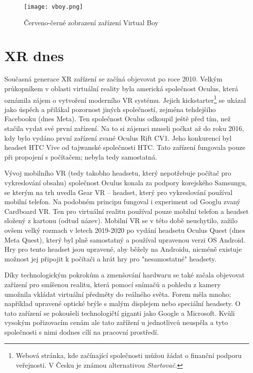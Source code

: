\begin{figure}[H]
    \centering
    \texttt{[image: vboy.png]}
    \caption{Červeno-černé zobrazení zařízení Virtual Boy \cite{vboy}}
    \label{vboy_red_display}
\end{figure}

\section{XR dnes}

Současná generace XR zařízení se začíná objevovat po roce 2010. Velkým průkopníkem v oblasti virtuální reality byla americká společnost Oculus, která oznámila zájem o vytvoření moderního VR systému. Jejich kickstarter\footnote{Webová stránka, kde začínající společnosti můžou žádat o finanční podporu veřejnosti. V Česku je známou alternativou \em Startovač.} se ukázal jako úspěch a přilákal pozornost jiných společností, zejména tehdejšího Facebooku (dnes Meta). Ten společnost Oculus odkoupil ještě před tím, než stačila vydat své první zařízení. Na to si zájemci museli počkat až do roku 2016, kdy bylo vydáno první zařízení zvané Oculus Rift CV1. Jeho konkurencí byl headset HTC Vive od tajwanské společnosti HTC. Tato zařízení fungovala pouze při propojení s počítačem; nebyla tedy samostatná. \cite{otechnice_3}

Vývoj mobilního VR (tedy takobho headsetu, který nepotřebuje počítač pro vykreslování obsahu) společnost Oculus konala za podpory korejského Samsungu, se kterým na trh uvedla Gear VR -- headset, který pro vykreslování používal mobilní telefon. Na podobném principu fungoval i experiment od Googlu zvaný Cardboard VR. Ten pro virtuální realitu používal pouze mobilní telefon a headset složený z kartonu (odtud název). Mobilní VR se v této době neuchytilo, zažilo ovšem velký rozmach v letech 2019-2020 po vydání headsetu Oculus Quest (dnes Meta Quest), který byl plně samostatný a používal upravenou verzi OS Android. Hry pro tento headset jsou upravené, aby běžely na Androidu, nicméně existuje možnost jej připojit k počítači a hrát hry pro "nesamostatné" headsety. \cite{otechnice_3}

Díky technologickým pokrokům a zmenšování hardwaru se také začala objevovat zařízení pro smíšenou realitu, která pomocí snímačů a pohledu z kamery umožnila vkládat virtuální předměty do reálného světa. Forem měla mnoho; například upravené optické brýle s malým displejem nebo speciální headsety. O tato zařízení se pokoušeli technologičtí giganti jako Google a Microsoft. Kvůli vysokým pořizovacím cenám ale tato zařížení u jednotlivců neuspěla a tyto společnosti s nimi dodnes cílí na pracovní prostředí. \cite{google_glass_mobilenet}

